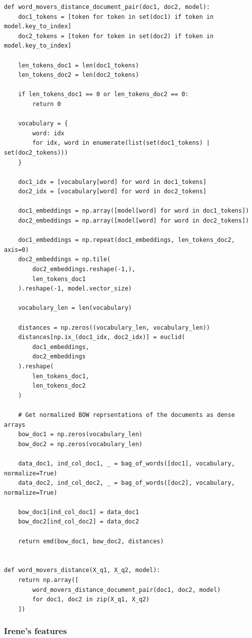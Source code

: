 \documentclass[11pt,a4paper]{article}
\begin{document}
\begin{lstlisting}
def word_movers_distance_document_pair(doc1, doc2, model):
    doc1_tokens = [token for token in set(doc1) if token in model.key_to_index]
    doc2_tokens = [token for token in set(doc2) if token in model.key_to_index]

    len_tokens_doc1 = len(doc1_tokens)
    len_tokens_doc2 = len(doc2_tokens)

    if len_tokens_doc1 == 0 or len_tokens_doc2 == 0:
        return 0

    vocabulary = {
        word: idx
        for idx, word in enumerate(list(set(doc1_tokens) | set(doc2_tokens)))
    }

    doc1_idx = [vocabulary[word] for word in doc1_tokens]
    doc2_idx = [vocabulary[word] for word in doc2_tokens]

    doc1_embeddings = np.array([model[word] for word in doc1_tokens])
    doc2_embeddings = np.array([model[word] for word in doc2_tokens])

    doc1_embeddings = np.repeat(doc1_embeddings, len_tokens_doc2, axis=0)
    doc2_embeddings = np.tile(
        doc2_embeddings.reshape(-1,),
        len_tokens_doc1
    ).reshape(-1, model.vector_size)

    vocabulary_len = len(vocabulary)

    distances = np.zeros((vocabulary_len, vocabulary_len))
    distances[np.ix_(doc1_idx, doc2_idx)] = euclid(
        doc1_embeddings,
        doc2_embeddings
    ).reshape(
        len_tokens_doc1,
        len_tokens_doc2
    )

    # Get normalized BOW reprsentations of the documents as dense arrays
    bow_doc1 = np.zeros(vocabulary_len)
    bow_doc2 = np.zeros(vocabulary_len)

    data_doc1, ind_col_doc1, _ = bag_of_words([doc1], vocabulary, normalize=True)
    data_doc2, ind_col_doc2, _ = bag_of_words([doc2], vocabulary, normalize=True)

    bow_doc1[ind_col_doc1] = data_doc1
    bow_doc2[ind_col_doc2] = data_doc2

    return emd(bow_doc1, bow_doc2, distances)


def word_movers_distance(X_q1, X_q2, model):
    return np.array([
        word_movers_distance_document_pair(doc1, doc2, model)
        for doc1, doc2 in zip(X_q1, X_q2)
    ])
\end{lstlisting}

\subsubsection{Irene's features}
\end{document}
